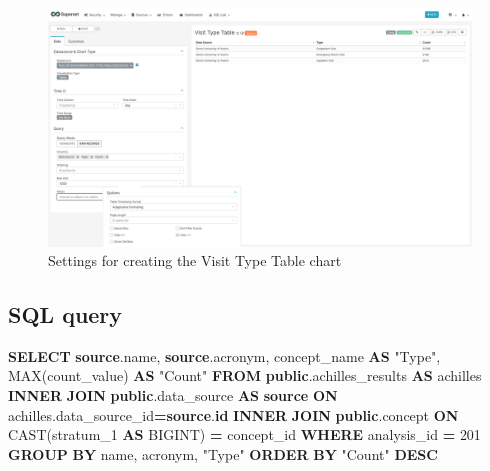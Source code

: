 \documentclass[
]{book}
\newenvironment{Shaded}{\begin{snugshade}}{\end{snugshade}}
\newcommand{\DecValTok}[1]{\textcolor[rgb]{0.00,0.00,0.81}{#1}}
\newcommand{\FunctionTok}[1]{\textcolor[rgb]{0.00,0.00,0.00}{#1}}
\newcommand{\KeywordTok}[1]{\textcolor[rgb]{0.13,0.29,0.53}{\textbf{#1}}}
\newcommand{\NormalTok}[1]{#1}
\newcommand{\OperatorTok}[1]{\textcolor[rgb]{0.81,0.36,0.00}{\textbf{#1}}}
\newcommand{\OtherTok}[1]{\textcolor[rgb]{0.56,0.35,0.01}{#1}}
\begin{document}
\begin{figure}
\includegraphics[width=1\linewidth]{images/06-visit/02-visit_types_table} \caption{Settings for creating the Visit Type Table chart}\label{fig:visitTypeTable}
\end{figure}

\hypertarget{sql-query-17}{%
\subsection{SQL query}\label{sql-query-17}}

\begin{Shaded}
\begin{Highlighting}[]
\KeywordTok{SELECT} \KeywordTok{source}\NormalTok{.name,}
       \KeywordTok{source}\NormalTok{.acronym,}
\NormalTok{       concept\_name }\KeywordTok{AS} \OtherTok{"Type"}\NormalTok{,}
       \FunctionTok{MAX}\NormalTok{(count\_value) }\KeywordTok{AS} \OtherTok{"Count"}
\KeywordTok{FROM} \KeywordTok{public}\NormalTok{.achilles\_results }\KeywordTok{AS}\NormalTok{ achilles}
\KeywordTok{INNER} \KeywordTok{JOIN} \KeywordTok{public}\NormalTok{.data\_source }\KeywordTok{AS} \KeywordTok{source} \KeywordTok{ON}\NormalTok{ achilles.data\_source\_id}\OperatorTok{=}\KeywordTok{source}\NormalTok{.}\KeywordTok{id}
\KeywordTok{INNER} \KeywordTok{JOIN} \KeywordTok{public}\NormalTok{.concept }\KeywordTok{ON} \FunctionTok{CAST}\NormalTok{(stratum\_1 }\KeywordTok{AS}\NormalTok{ BIGINT) }\OperatorTok{=}\NormalTok{ concept\_id}
\KeywordTok{WHERE}\NormalTok{ analysis\_id }\OperatorTok{=} \DecValTok{201}
\KeywordTok{GROUP} \KeywordTok{BY}\NormalTok{ name, acronym, }\OtherTok{"Type"}
\KeywordTok{ORDER} \KeywordTok{BY} \OtherTok{"Count"} \KeywordTok{DESC}
\end{Highlighting}
\end{Shaded}
\end{document}
